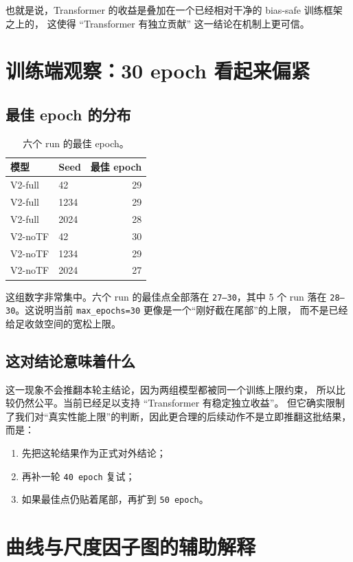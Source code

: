 \documentclass[11pt,a4paper]{ctexart}
\begin{document}
也就是说，Transformer 的收益是叠加在一个已经相对干净的 bias-safe 训练框架之上的，
这使得 ``Transformer 有独立贡献'' 这一结论在机制上更可信。

\section{训练端观察：30 epoch 看起来偏紧}

\subsection{最佳 epoch 的分布}

\begin{table}[H]
\centering
\small
\caption{六个 run 的最佳 epoch。}
\begin{tabular}{llr}
\toprule
模型 & Seed & 最佳 epoch \\
\midrule
V2-full & 42   & 29 \\
V2-full & 1234 & 29 \\
V2-full & 2024 & 28 \\
V2-noTF & 42   & 30 \\
V2-noTF & 1234 & 29 \\
V2-noTF & 2024 & 27 \\
\bottomrule
\end{tabular}
\end{table}

这组数字非常集中。六个 run 的最佳点全部落在 \texttt{27--30}，其中 5 个 run 落在
\texttt{28--30}。这说明当前 \texttt{max\_epochs=30} 更像是一个“刚好截在尾部”的上限，
而不是已经给足收敛空间的宽松上限。

\subsection{这对结论意味着什么}

这一现象不会推翻本轮主结论，因为两组模型都被同一个训练上限约束，
所以比较仍然公平。当前已经足以支持 ``Transformer 有稳定独立收益''。
但它确实限制了我们对“真实性能上限”的判断，因此更合理的后续动作不是立即推翻这批结果，
而是：
\begin{enumerate}[leftmargin=2em]
  \item 先把这轮结果作为正式对外结论；
  \item 再补一轮 \texttt{40 epoch} 复试；
  \item 如果最佳点仍贴着尾部，再扩到 \texttt{50 epoch}。
\end{enumerate}

\section{曲线与尺度因子图的辅助解释}
\end{document}
